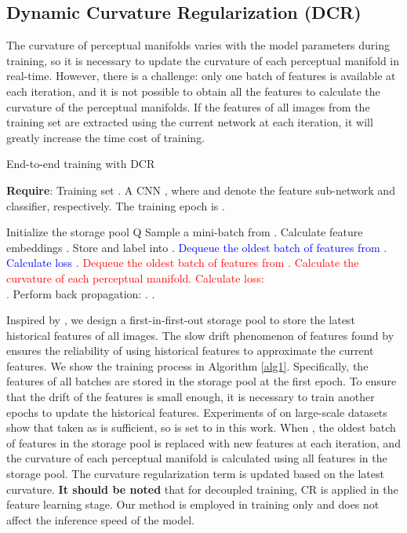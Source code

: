 \documentclass[10pt,twocolumn,letterpaper]{article}
\begin{document}
\subsection{Dynamic Curvature Regularization (DCR)}
\label{sec5.3}

The curvature of perceptual manifolds varies with the model parameters during training, so it is necessary to update the curvature of each perceptual manifold in real-time. However, there is a challenge: only one batch of features is available at each iteration, and it is not possible to obtain all the features to calculate the curvature of the perceptual manifolds. If the features of all images from the training set are extracted using the current network at each iteration, it will greatly increase the time cost of training.

\begin{algorithm}[h]
\caption{End-to-end training with DCR}
\label{alg1}
\footnotesize{
\textbf{Require}: Training set . A CNN , where  and  denote the feature sub-network and classifier, respectively. The training epoch is .
\begin{algorithmic}[1] \STATE Initialize the storage pool Q
\STATE Sample a mini-batch  from .
\STATE Calculate feature embeddings .
\STATE Store  and label  into .
\IF {}
\IF {}
\STATE \textcolor{blue}{Dequeue the oldest batch of features from .}
\ENDIF 
\STATE \textcolor{blue}{Calculate loss .}
\ELSE
\STATE \textcolor{red}{Dequeue the oldest batch of features from .}
\STATE \textcolor{red}{Calculate the curvature of each perceptual manifold.}
\STATE \textcolor{red}{Calculate loss: \\ .}
\ENDIF
\STATE Perform back propagation: .
\STATE .
\ENDFOR
\ENDFOR
\end{algorithmic}}
\end{algorithm}

Inspired by \cite{paper15,paper28}, we design a first-in-first-out storage pool to store the latest historical features of all images. The slow drift phenomenon of features found by \cite{paper54} ensures the reliability of using historical features to approximate the current features. We show the training process in Algorithm \ref{alg1}. Specifically, the features of all batches are stored in the storage pool at the first epoch. To ensure that the drift of the features is small enough, it is necessary to train another  epochs to update the historical features. Experiments of \cite{paper28} on large-scale datasets show that  taken as  is sufficient, so  is set to  in this work. When , the oldest batch of features in the storage pool is replaced with new features at each iteration, and the curvature of each perceptual manifold is calculated using all features in the storage pool. The curvature regularization term is updated based on the latest curvature.
\textbf{It should be noted} that for decoupled training, CR is applied in the feature learning stage. Our method is employed in training only and does not affect the inference speed of the model.
\end{document}
